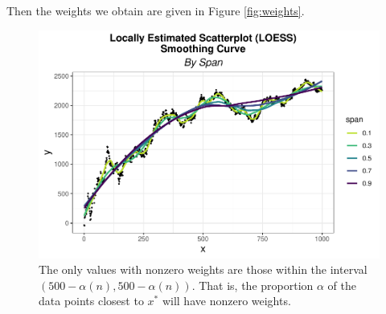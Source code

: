 \documentclass[12pt,twoside]{smiththesis}
\begin{document}
Then the weights we obtain are given in Figure \ref{fig:weights}.
\begin{figure}

{\centering \includegraphics[width=1\linewidth]{thesis_files/figure-latex/unnamed-chunk-25-1} 

}

\caption{\label{fig:weights} The only values with nonzero weights are those within the interval $(500 - \alpha (n), 500 - \alpha (n))$. That is, the proportion $\alpha$ of the data points closest to $x^*$ will have nonzero weights.}\label{fig:unnamed-chunk-25}
\end{figure}
\newpage
\end{document}
